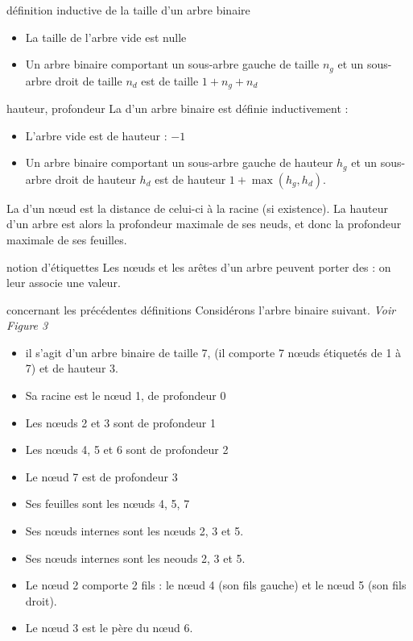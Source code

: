 \begin{remarque}{7.4}{définition inductive de la taille d'un arbre binaire}
    \begin{itemize}
        \item La taille de l'arbre vide est nulle
        \item Un arbre binaire comportant un sous-arbre gauche de taille $n_g$ et un sous-arbre droit de taille $n_d$ est de taille $1+n_g+n_d$ 
    \end{itemize}
    
\end{remarque}

\begin{definition}{7.5}{hauteur, profondeur}
    La  d'un arbre binaire est définie inductivement : \begin{itemize}
        \item L'arbre vide est de hauteur : $-1$
        \item Un arbre binaire comportant un sous-arbre gauche de hauteur $h_g$ et un sous-arbre droit de hauteur $h_d$ est de hauteur $1+\max(h_g,h_d)$.
    \end{itemize}
    La  d'un nœud est la distance de celui-ci à la racine (si existence). La hauteur d'un arbre est alors la profondeur maximale de ses neuds, et donc la profondeur maximale de ses feuilles.
\end{definition}

\begin{remarque}{7.6}{notion d'étiquettes}
    Les nœuds et les arêtes d'un arbre peuvent porter des  : on leur associe une valeur.
\end{remarque}

\begin{exemple}{7.7}{concernant les précédentes définitions}
    Considérons l'arbre binaire suivant. \textit{Voir Figure 3}
    \begin{itemize}
        \item il s'agit d'un arbre binaire de taille 7, (il comporte 7 nœuds étiquetés de 1 à 7) et de hauteur 3.
        \item Sa racine est le nœud 1, de profondeur 0
        \item Les nœuds 2 et 3 sont de profondeur 1
        \item Les nœuds 4, 5 et 6 sont de profondeur 2
        \item Le nœud 7 est de profondeur 3
        \item Ses feuilles sont les nœuds 4, 5, 7
        \item Ses nœuds internes sont les nœuds 2, 3 et 5.
        \item Ses nœuds internes sont les neouds 2, 3 et 5.
        \item Le nœud 2 comporte 2 fils : le nœud 4 (son fils gauche) et le nœud 5 (son fils droit).
        \item Le nœud 3 est le père du nœud 6.
    \end{itemize}
\end{exemple}

